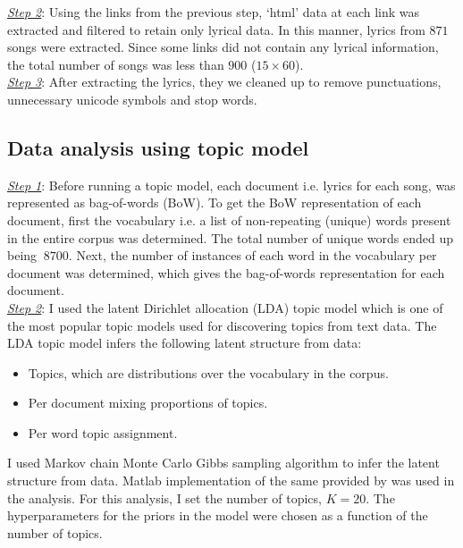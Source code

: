 \documentclass{article}
\begin{document}
    \underline{\emph{Step 2}}: Using the links from the previous step, `html' data at each link was extracted and filtered to retain only lyrical data. In this manner, lyrics from $871$ songs were extracted. Since some links did not contain any lyrical information, the total number of songs was less than $900$ ($15 \times 60$).\\
    \underline{\emph{Step 3}}: After extracting the lyrics, they we cleaned up to remove punctuations, unnecessary unicode symbols and stop words.

    \subsection{Data analysis using topic model}
    \underline{\emph{Step 1}}: Before running a topic model, each document i.e. lyrics for each song, was represented as bag-of-words (BoW). To get the BoW representation of each document, first the vocabulary i.e. a list of non-repeating (unique) words present in the entire corpus was determined. The total number of unique words ended up being $~8700$. Next, the number of instances of each word in the vocabulary per document was determined, which gives the bag-of-words representation for each document.\\
    \underline{\emph{Step 2}}: I used the latent Dirichlet allocation (LDA) topic model \cite{blei}  which is one of the most popular topic models used for discovering topics from text data. The LDA topic model infers the following latent structure from data:
    \begin{itemize}
      \item Topics, which are distributions over the vocabulary in the corpus.
      \item Per document mixing proportions of topics.
      \item Per word topic assignment.
    \end{itemize}
    I used Markov chain Monte Carlo Gibbs sampling \cite{geman} algorithm to infer the latent structure from data. Matlab implementation of the same provided by \cite{griffiths} was used in the analysis. For this analysis, I set the number of topics, $K=20$. The hyperparameters for the priors in the model were chosen as a function of the number of topics.
\end{document}
